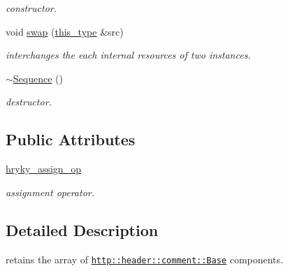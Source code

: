 \begin{DoxyCompactItemize}
\begin{DoxyCompactList}\small\item\em constructor. \end{DoxyCompactList}\item 
\hypertarget{classhryky_1_1http_1_1header_1_1comment_1_1_sequence_a8ccab4d0ded9d105ae96a0518bcab649}{void \hyperlink{classhryky_1_1http_1_1header_1_1comment_1_1_sequence_a8ccab4d0ded9d105ae96a0518bcab649}{swap} (\hyperlink{classhryky_1_1http_1_1header_1_1comment_1_1_sequence_a7907326adb8e22a86633e398acc9bf08}{this\-\_\-type} \&src)}\label{classhryky_1_1http_1_1header_1_1comment_1_1_sequence_a8ccab4d0ded9d105ae96a0518bcab649}

\begin{DoxyCompactList}\small\item\em interchanges the each internal resources of two instances. \end{DoxyCompactList}\item 
\hypertarget{classhryky_1_1http_1_1header_1_1comment_1_1_sequence_aba22f8c7300fbaf79667ee70189eb2fd}{\hyperlink{classhryky_1_1http_1_1header_1_1comment_1_1_sequence_aba22f8c7300fbaf79667ee70189eb2fd}{$\sim$\-Sequence} ()}\label{classhryky_1_1http_1_1header_1_1comment_1_1_sequence_aba22f8c7300fbaf79667ee70189eb2fd}

\begin{DoxyCompactList}\small\item\em destructor. \end{DoxyCompactList}\end{DoxyCompactItemize}
\subsection*{Public Attributes}
\begin{DoxyCompactItemize}
\item 
\hypertarget{classhryky_1_1http_1_1header_1_1comment_1_1_sequence_ae4bf4ab1ca6f60ed52165cd3fc122552}{\hyperlink{classhryky_1_1http_1_1header_1_1comment_1_1_sequence_ae4bf4ab1ca6f60ed52165cd3fc122552}{hryky\-\_\-assign\-\_\-op}}\label{classhryky_1_1http_1_1header_1_1comment_1_1_sequence_ae4bf4ab1ca6f60ed52165cd3fc122552}

\begin{DoxyCompactList}\small\item\em assignment operator. \end{DoxyCompactList}\end{DoxyCompactItemize}


\subsection{Detailed Description}
retains the array of \href{http::header::comment::Base}{\tt http\-::header\-::comment\-::\-Base} components. 


